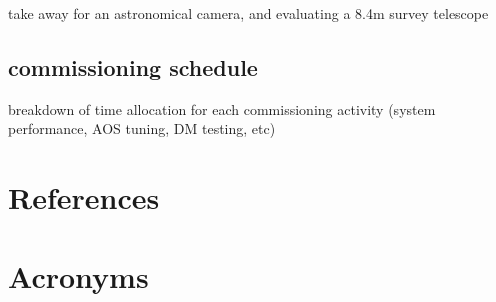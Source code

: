 \documentclass[modern]{aastex62}
\begin{document}
take away for an astronomical camera, and evaluating a 8.4m survey telescope

\subsection{commissioning schedule}

breakdown of time allocation for each commissioning activity (system performance, AOS tuning, DM testing, etc)


\appendix

\section{References} \label{sec:bib}



\section{Acronyms} \label{sec:acronyms}

\end{document}
